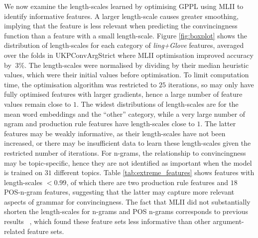 We now examine the length-scales learned by optimising GPPL using MLII  
to identify informative features. 
A larger length-scale causes greater smoothing, 
implying that the feature is less relevant when predicting the convincingness function
than a feature with a small length-scale. 
Figure \ref{fig:boxplot} shows the distribution of length-scales for each category of
\emph{ling+Glove} features, averaged over the folds in UKPConvArgStrict where MLII
optimisation improved accuracy by $\>3\%$. The length-scales
were normalised by dividing by their median heuristic values, 
which were their initial values before optimisation.
To limit computation time, the optimisation algorithm was restricted to $25$ iterations, so may only have fully optimised features with larger gradients, 
hence a large number of feature values remain close to $1$.
The widest distributions of length-scales are for the mean word embeddings and the ``other'' category, while a very large number of ngram and production rule features 
have length-scales close to $1$. The latter features may be weakly informative, 
as their length-scales have not been increased, or there may be insufficient 
data to learn these length-scales given the restricted number of iterations.
For n-grams, the relationship to convincingness may be topic-specific, 
hence they are not identified as important when the model is trained on $31$ different topics. 
Table \ref{tab:extreme_features} shows features with length-scales $<0.99$,
of which there are two production rule features and $18$ POS-n-gram features,
suggesting that the latter may capture more relevant aspects of grammar for convincingness. 
The fact that MLII did not substantially shorten the length-scales for n-grams and POS n-grams 
corresponds to previous results ~\cite{persing2017can}, which found these feature sets less informative than other argument-related feature sets.
 
